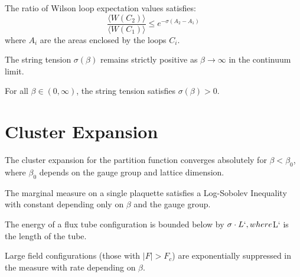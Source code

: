 \begin{theorem}
\label{thm:ratio-bound}
The ratio of Wilson loop expectation values satisfies:
\begin{equation}
\frac{\langle W(C_2) \rangle}{\langle W(C_1) \rangle} \le e^{-\sigma (A_2 - A_1)}
\end{equation}
where $A_i$ are the areas enclosed by the loops $C_i$.
\end{theorem}

\begin{theorem}
\label{thm:sigma-positive-continuum}
The string tension $\sigma(\beta)$ remains strictly positive as $\beta \to \infty$ in the continuum limit.
\end{theorem}

\begin{theorem}
\label{thm:sigma-positive-all-beta}
For all $\beta \in (0, \infty)$, the string tension satisfies $\sigma(\beta) > 0$.
\end{theorem}

\section{Cluster Expansion}
\label{sec:cluster-expansion}

\begin{theorem}
The cluster expansion for the partition function converges absolutely for $\beta < \beta_0$, where $\beta_0$ depends on the gauge group and lattice dimension.
\end{theorem}

\begin{theorem}
\label{thm:marginal-lsi}
The marginal measure on a single plaquette satisfies a Log-Sobolev Inequality with constant depending only on $\beta$ and the gauge group.
\end{theorem}

\begin{lemma}
\label{lem:string-energy}
The energy of a flux tube configuration is bounded below by $\sigma \cdot L`, where $L` is the length of the tube.
\end{lemma}

\begin{theorem}
\label{thm:large-field}
Large field configurations (those with $|F| > F_c$) are exponentially suppressed in the measure with rate depending on $\beta$.
\end{theorem}


